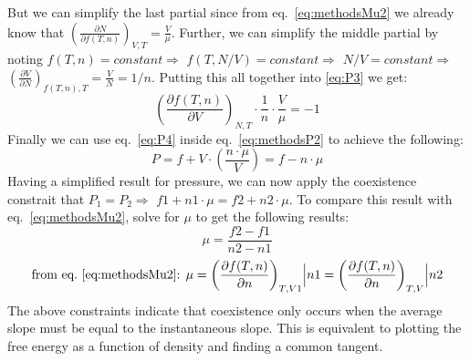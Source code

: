 \sloppy But we can simplify the last partial since from eq.~\ref{eq:methodsMu2} we already know that $\left(\frac{\partial N}{\partial f(T,n)}\right)_{V,T}=\frac{V}{\mu}$. Further, we can simplify the middle partial by noting $f(T,n)=constant\Rightarrow$ $f(T,N/V)=constant \Rightarrow$ $N/V=constant \Rightarrow$ $\left(\frac{\partial V}{\partial N}\right)_{f(T,n),T}=\frac{V}{N}=1/n$. Putting this all together into \ref{eq:P3} we get:
\begin{equation}\label{eq:P4}
\left(\frac{\partial f(T,n)}{\partial V}\right)_{N,T} \cdot \frac{1}{n} \cdot \frac{V}{\mu}=-1
\end{equation}
Finally we can use eq.~\ref{eq:P4} inside eq.~\ref{eq:methodsP2} to achieve the following:
\begin{equation}\label{eq:P5}
P=f+V\cdot\left( \frac{n\cdot \mu}{V} \right)=f-n\cdot\mu
\end{equation}
Having a simplified result for pressure, we can now apply the coexistence constrait that $P_1=P_2 \Rightarrow$ $f1+n1\cdot\mu=f2+n2\cdot\mu$. To compare this result with eq.~\ref{eq:methodsMu2}, solve for $\mu$ to get the following results:
\begin{equation}\label{eq:mu3p}
\mu=\frac{f2-f1}{n2-n1}
\end{equation}
\begin{equation}\label{eq:mu3}
\text{from eq.~\ref{eq:methodsMu2}: }\mu= \left(\frac{\partial f(T,n)}{\partial n}\right)_{T,V1}\Bigr|n1=\left(\frac{\partial f(T,n)}{\partial n}\right)_{T,V}\Bigr|n2
\end{equation}
The above constraints indicate that coexistence only occurs when the average slope must be equal to the instantaneous slope. This is equivalent to plotting the free energy as a function of density and finding a common tangent.


